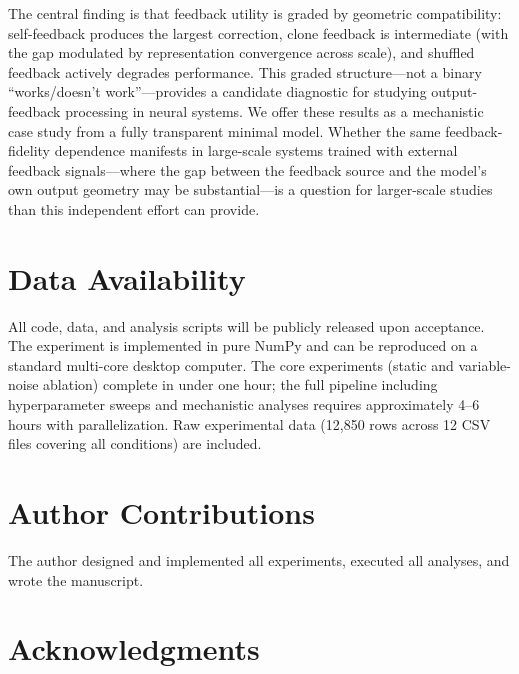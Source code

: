 \documentclass[10pt]{article}
\begin{document}
The central finding is that feedback utility is graded by geometric compatibility: self-feedback produces the largest correction, clone feedback is intermediate (with the gap modulated by representation convergence across scale), and shuffled feedback actively degrades performance. This graded structure---not a binary ``works/doesn't work''---provides a candidate diagnostic for studying output-feedback processing in neural systems. We offer these results as a mechanistic case study from a fully transparent minimal model. Whether the same feedback-fidelity dependence manifests in large-scale systems trained with external feedback signals---where the gap between the feedback source and the model's own output geometry may be substantial---is a question for larger-scale studies than this independent effort can provide.

\section*{Data Availability}

All code, data, and analysis scripts will be publicly released upon acceptance. The experiment is implemented in pure NumPy and can be reproduced on a standard multi-core desktop computer. The core experiments (static and variable-noise ablation) complete in under one hour; the full pipeline including hyperparameter sweeps and mechanistic analyses requires approximately 4--6 hours with parallelization. Raw experimental data (12,850 rows across 12 CSV files covering all conditions) are included.

\section*{Author Contributions}

The author designed and implemented all experiments, executed all analyses, and wrote the manuscript.

\section*{Acknowledgments}
\end{document}
